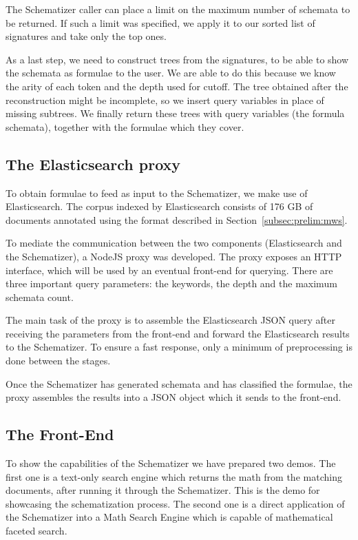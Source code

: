 The Schematizer caller can place a limit on the maximum number of schemata to be
returned. If such a limit was specified, we apply it to our sorted list of
signatures and take only the top ones.

As a last step, we need to construct \cmml trees from the signatures,
to be able to show the schemata as formulae to the user. We are able to do
this because we know the arity of each token and the depth used for cutoff.
The tree obtained after the reconstruction might be incomplete, so we insert
query variables in place of missing subtrees.
We finally return these \cmml trees with query variables (the formula
schemata), together with the formulae which they cover.

\subsection{The Elasticsearch proxy}\label{subsec:esproxy}
To obtain formulae to feed as input to the Schematizer, we make use of
Elasticsearch. The corpus indexed by Elasticsearch consists of 176 GB of \arxiv
documents annotated using the format described in
Section~\ref{subsec:prelim:mws}.

To mediate the communication between the two components (Elasticsearch and the
Schematizer), a NodeJS proxy was developed. The proxy exposes an HTTP
interface, which will be used by an eventual front-end for querying.
There are three important query parameters: the keywords, the depth and the
maximum schemata count.

The main task of the proxy is to assemble the Elasticsearch JSON query after
receiving the parameters from the front-end and forward the Elasticsearch
results to the Schematizer. To ensure a fast response, only a minimum of
preprocessing is done between the stages.

Once the Schematizer has generated schemata and has classified the formulae,
the proxy assembles the results into a JSON object which it sends to the
front-end.

\subsection{The Front-End}\label{subsec:frontend_schema}
To show the capabilities of the Schematizer we have prepared two demos.
The first one is a text-only search engine which returns the math from the
matching documents, after running it through the Schematizer. This is the demo
for showcasing the schematization process. The second one is a direct
application of the Schematizer into a Math Search Engine which is capable of
mathematical faceted search.

